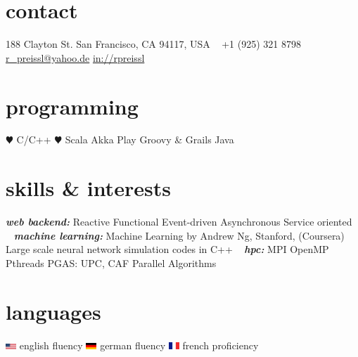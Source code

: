 \documentclass[]{friggeri-cv} %
\begin{document}


\begin{aside} %
\section{contact}
188 Clayton St.
San Francisco,
CA 94117, USA
~
+1 (925) 321 8798
~
\href{mailto:r\_preissl@yahoo.de}{r\_preissl@yahoo.de}
\href{http://www.linkedin.com/pub/robert-preissl/a/66a/903/}{in://rpreissl}
~
\section{programming}
{\color{red} $\varheartsuit$} C/C++
{\color{red} $\varheartsuit$} Scala
Akka
Play
Groovy \& Grails
Java
\section{skills \& interests}
\textit{\textbf{web backend:}}
{\color{orange}{\large{$\star$}}} Reactive
{\color{orange}{\large{$\star$}}} Functional
{\color{orange}{\large{$\star$}}} Event-driven
{\color{orange}{\large{$\star$}}} Asynchronous
{\color{orange}{\large{$\star$}}} Service oriented
~
\textit{\textbf{machine learning:}}
{\color{orange}{\large{$\star$}}} Machine Learning by Andrew Ng, Stanford, (Coursera)
{\color{orange}{\large{$\star$}}} Large scale neural network simulation codes in C++
~
\textit{\textbf{hpc:}}
{\color{orange}{\large{$\star$}}} MPI
{\color{orange}{\large{$\star$}}} OpenMP
{\color{orange}{\large{$\star$}}} Pthreads
{\color{orange}{\large{$\star$}}} PGAS: UPC, CAF
{\color{orange}{\large{$\star$}}} Parallel Algorithms
~
\section{languages}
\includegraphics[width=0.4cm]{Images/usflag} \hspace{0.15em} english fluency
\includegraphics[width=0.4cm]{Images/german_flag} \hspace{0.15em} german fluency
\includegraphics[width=0.4cm]{Images/france_flag} \hspace{0.15em} french proficiency
\end{aside}
\end{document}
